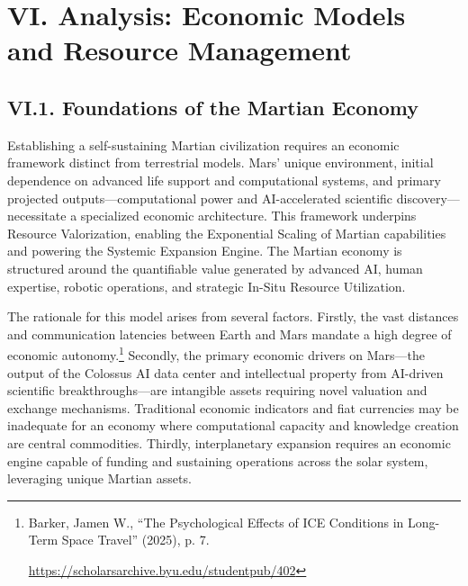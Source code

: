 \documentclass[fontsize=10pt, oneside, DIV=calc]{scrartcl}
\begin{document}
\label{fig:fab_isru_roadmap}



            
\section*{VI. Analysis: Economic Models and Resource Management}



\subsection*{VI.1. Foundations of the Martian Economy}



\medskip

\noindent
Establishing a self-sustaining Martian civilization requires an economic framework distinct from terrestrial models. Mars' unique environment, initial dependence on advanced life support and computational systems, and primary projected outputs---computational power and AI-accelerated scientific discovery---necessitate a specialized economic architecture. This framework underpins Resource Valorization, enabling the Exponential Scaling of Martian capabilities and powering the Systemic Expansion Engine. The Martian economy is structured around the quantifiable value generated by advanced AI, human expertise, robotic operations, and strategic In-Situ Resource Utilization.

\medskip

\noindent
The rationale for this model arises from several factors. Firstly, the vast distances and communication latencies between Earth and Mars mandate a high degree of economic autonomy.\footnote{Barker, Jamen W., ``The Psychological Effects of ICE Conditions in Long-Term Space Travel'' (2025), p. 7. 







\href{https://scholarsarchive.byu.edu/studentpub/402}\url{https://scholarsarchive.byu.edu/studentpub/402}} Secondly, the primary economic drivers on Mars---the output of the Colossus AI data center and intellectual property from AI-driven scientific breakthroughs---are intangible assets requiring novel valuation and exchange mechanisms. Traditional economic indicators and fiat currencies may be inadequate for an economy where computational capacity and knowledge creation are central commodities. Thirdly, interplanetary expansion requires an economic engine capable of funding and sustaining operations across the solar system, leveraging unique Martian assets.
\end{document}
